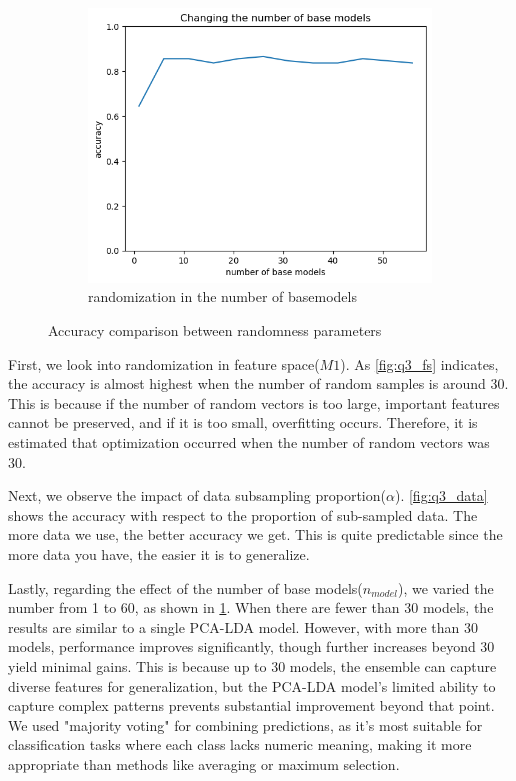 \begin{figure}
	\begin{subfigure}[t]{0.48\linewidth}
		\centering
		\includegraphics[width=\linewidth]{image/q3_basemodel.png}
		\caption{randomization in the number of basemodels}
		\label{fig:q3_base}
	\end{subfigure}
	\caption{Accuracy comparison between randomness parameters}
	\label{fig:q3_random}
\end{figure}

First, we look into randomization in feature space($M1$). As \cref{fig:q3_fs} indicates, the accuracy is almost highest when the number of random samples is around 30. This is because if the number of random vectors is too large, important features cannot be preserved, and if it is too small, overfitting occurs. Therefore, it is estimated that optimization occurred when the number of random vectors was 30.

Next, we observe the impact of data subsampling proportion($\alpha$). \cref{fig:q3_data} shows the accuracy with respect to the proportion of sub-sampled data. The more data we use, the better accuracy we get. This is quite predictable since the more data you have, the easier it is to generalize.

Lastly, regarding the effect of the number of base models($n_{model}$), we varied the number from 1 to 60, as shown in \cref{fig:q3_base}. When there are fewer than 30 models, the results are similar to a single PCA-LDA model. However, with more than 30 models, performance improves significantly, though further increases beyond 30 yield minimal gains. This is because up to 30 models, the ensemble can capture diverse features for generalization, but the PCA-LDA model’s limited ability to capture complex patterns prevents substantial improvement beyond that point. We used "majority voting" for combining predictions, as it’s most suitable for classification tasks where each class lacks numeric meaning, making it more appropriate than methods like averaging or maximum selection.

